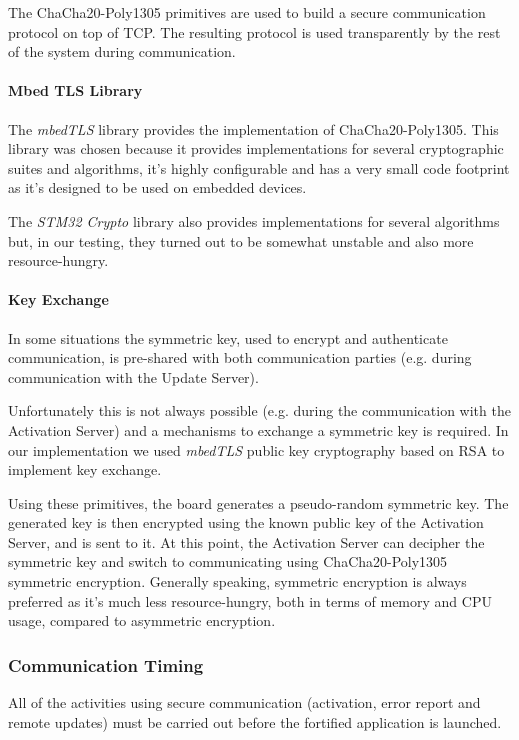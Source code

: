 \documentclass{article}
\begin{document}
The ChaCha20-Poly1305 primitives are used to build a secure communication protocol on top of TCP. The resulting protocol is used transparently by the rest of the system during communication.

\paragraph{Mbed TLS Library}
The \textit{mbedTLS} library provides the implementation of ChaCha20-Poly1305. This library was chosen because it provides implementations for several cryptographic suites and algorithms, it's highly configurable and has a very small code footprint as it's designed to be used on embedded devices.

The \textit{STM32 Crypto} library also provides implementations for several algorithms but, in our testing, they turned out to be somewhat unstable and also more resource-hungry.

\paragraph{Key Exchange}
In some situations the symmetric key, used to encrypt and authenticate communication, is pre-shared with both communication parties (e.g. during communication with the Update Server).

Unfortunately this is not always possible (e.g. during the communication with the Activation Server) and a mechanisms to exchange a symmetric key is required. In our implementation we used \textit{mbedTLS} public key cryptography based on RSA to implement key exchange.

Using these primitives, the board generates a pseudo-random symmetric key. The generated key is then encrypted using the known public key of the Activation Server, and is sent to it. At this point, the Activation Server can decipher the symmetric key and switch to communicating using ChaCha20-Poly1305 symmetric encryption. Generally speaking, symmetric encryption is always preferred as it's much less resource-hungry, both in terms of memory and CPU usage, compared to asymmetric encryption.

\subsubsection{Communication Timing}
All of the activities using secure communication (activation, error report and remote updates) must be carried out before the fortified application is launched.
\end{document}

